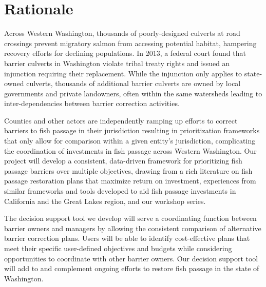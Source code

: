 \documentclass[12pt]{elsarticle}
\begin{document}
		\section{Rationale}
			Across Western Washington, thousands of poorly-designed culverts at road crossings prevent migratory salmon from accessing potential habitat, hampering recovery efforts for declining populations. In 2013, a federal court found that barrier culverts in Washington violate tribal treaty rights and issued an injunction requiring their replacement. While the injunction only applies to state-owned culverts, thousands of additional barrier culverts are owned by local governments and private landowners, often within the same watersheds leading to inter-dependencies between barrier correction activities. 
			
			Counties and other actors are independently ramping up efforts to correct barriers to fish passage in their jurisdiction resulting in prioritization frameworks that only allow for comparison within a given entity's jurisdiction, complicating the coordination of investments in fish passage across Western Washington. Our project will develop a consistent, data-driven framework for prioritizing fish passage barriers over multiple objectives, drawing from a rich literature on fish passage restoration plans that maximize return on investment, experiences from similar frameworks and tools developed to aid fish passage investments in California and the Great Lakes region, and our workshop series. 
			
			The decision support tool we develop will serve a coordinating function between barrier owners and managers by allowing the consistent comparison of alternative barrier correction plans. Users will be able to identify cost-effective plans that meet their specific user-defined objectives and budgets while considering opportunities to coordinate with other barrier owners. Our decision support tool will add to and complement ongoing efforts to restore fish passage in the state of Washington.

			
			
			
\end{document}
